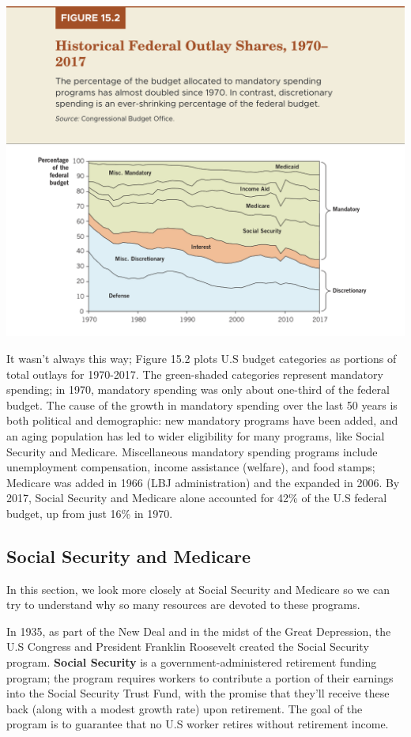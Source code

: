 \documentclass[11pt]{article} %
\begin{document}
\begin{center}
\includegraphics[scale=0.5]{images/Figure 15.2.png}
\end{center}
It wasn't always this way; Figure 15.2 plots U.S budget categories as portions of total outlays for 1970-2017. The green-shaded categories represent mandatory spending; in 1970, mandatory spending was only about one-third of the federal budget. The cause of the growth in mandatory spending over the last 50 years is both political and demographic: new mandatory programs have been added, and an aging population has led to wider eligibility for many programs, like Social Security and Medicare. Miscellaneous mandatory spending programs include unemployment compensation, income assistance (welfare), and food stamps; Medicare was added in 1966 (LBJ administration) and the expanded in 2006. By 2017, Social Security and Medicare alone accounted for 42\% of the U.S federal budget, up from just 16\% in 1970.

\subsection*{Social Security and Medicare}
In this section, we look more closely at Social Security and Medicare so we can try to understand why so many resources are devoted to these programs.

In 1935, as part of the New Deal and in the midst of the Great Depression, the U.S Congress and President Franklin Roosevelt created the Social Security program. \textbf{Social Security} is a government-administered retirement funding program; the program requires workers to contribute a portion of their earnings into the Social Security Trust Fund, with the promise that they'll receive these back (along with a modest growth rate) upon retirement. The goal of the program is to guarantee that no U.S worker retires without retirement income.
\end{document}
